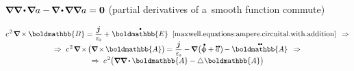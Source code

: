 ${\boldnabla \boldnabla \hspace{-0.2ex} \dotp \hspace{-0.25ex} \boldnabla a - \hspace{-0.2ex} \boldnabla \hspace{-0.2ex} \dotp \hspace{-0.25ex} \boldnabla \boldnabla a = \zerovector}$ (partial derivatives of a~smooth function commute)

\nopagebreak\vspace{-0.4em}\begin{multline}\label{electromagnetic.secondequationofwave}
c^{\hspace{.16ex}2} \hspace{.22ex} \boldnabla \hspace{-0.15ex} \times \hspace{-0.1ex} \boldmathbb{B}
= \displaystyle \frac{\currentdensity}{\raisemath{.16em}{\vacuumpermittivity}} + \hspace{.1ex} \mathdotabove{\boldmathbb{E}}
\;\;\eqref{maxwell.equations:ampere.circuital.with.addition}
\hspace{.44em} \Rightarrow
%
\\[-0.4em]
%
\Rightarrow \hspace{.33em}
c^{\hspace{.16ex}2} \hspace{.22ex} \boldnabla \hspace{-0.2ex} \times \hspace{-0.3ex} \bigl( \boldnabla \hspace{-0.2ex} \times \hspace{-0.2ex} \boldmathbb{A} \bigr) \hspace{-0.15ex}
= \hspace{.1ex} \displaystyle \frac{\currentdensity}{\raisemath{.16em}{\vacuumpermittivity}} - \hspace{-0.15ex} \boldnabla \hspace{.1ex} \bigl( \mathdotabove{\upphi} \hspace{-0.1ex} + \mathdotdotabove{a} \hspace{.2ex} \bigr) \hspace{-0.3ex} - \mathdotdotabove{\boldmathbb{A}}
\hspace{.44em} \Rightarrow
%
\\[-0.4em]
%
\Rightarrow \hspace{.33em}
c^{\hspace{.16ex}2} \bigl( \boldnabla \boldnabla \hspace{-0.1ex} \dotp \boldmathbb{A} - \Laplacian \hspace{.05ex} \boldmathbb{A} \bigr) \hspace{-0.15ex}

\end{multline}
